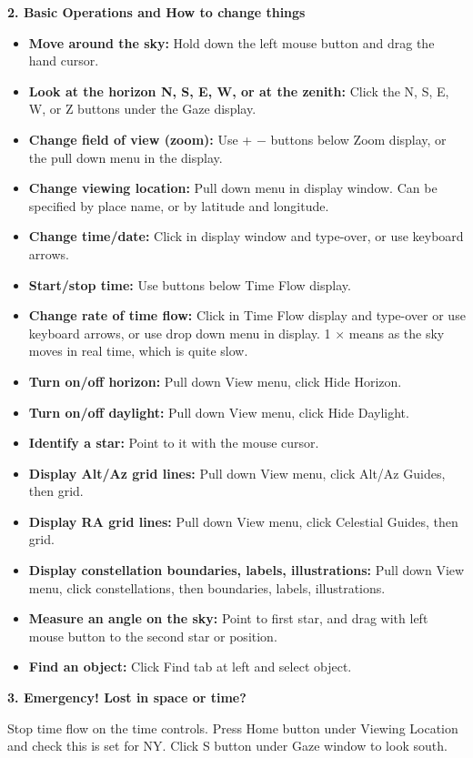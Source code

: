 \clearpage
\noindent
{\bf 2. Basic Operations and How to change things}

\smallskip
\noindent


\begin{itemize}
\item {\bf Move around the sky:}  Hold down the left mouse button and drag
 the hand cursor.

\item {\bf Look at the horizon N, S, E, W, or at the  zenith:} Click the
  N, S, E, W, or Z buttons under the Gaze display.

\item {\bf Change field of view (zoom):} Use + $-$ buttons below Zoom
  display, or the pull down menu in the display. 

\item {\bf Change viewing location:} Pull down menu in display
  window. Can be specified by place name, or by latitude and longitude.

\item {\bf Change time/date:} Click in display window and type-over,
 or use keyboard arrows. 

\item{\bf Start/stop time:} Use buttons below Time Flow display.

\item {\bf Change rate of time flow:} Click in Time Flow display and type-over or
 use keyboard arrows, or use drop down menu in display. 1 $\times$
 means as the sky moves in real time, which is quite slow.


\item{\bf Turn on/off horizon:} Pull down View menu, click Hide Horizon.

\item{\bf Turn on/off daylight:} Pull down View menu, click Hide Daylight.

\item{\bf Identify a star:} Point to it with the mouse cursor.  

\item{\bf Display Alt/Az grid lines:} Pull down View menu, click
  Alt/Az Guides, then grid. 

\item{\bf Display RA grid lines:} Pull down View menu, click
  Celestial Guides, then grid. 

\item{\bf Display constellation boundaries, labels, illustrations:}
  Pull down View menu, click constellations, then boundaries, labels,
  illustrations. 


\item{\bf Measure an angle on the sky:} Point to first star, and drag with left
  mouse button to the second star or position.

\item {\bf Find an object:} Click Find tab at left and select object. 

\end{itemize}

\bigskip
\medskip
\noindent
{\bf 3. Emergency! Lost in space or time?}

\smallskip
\noindent
Stop time flow on the time controls. Press Home button under Viewing
Location and check this is set for NY. Click S button under Gaze
window to look south.

